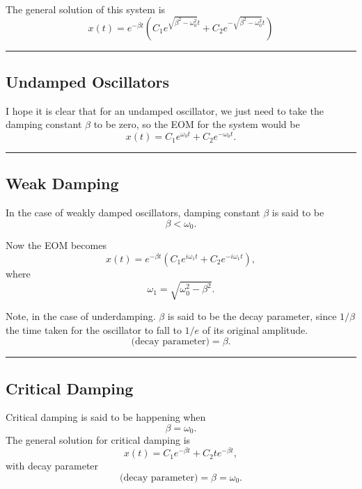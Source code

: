 \documentclass[12pt,english]{article}
\numberwithin{equation}{subsection}
\begin{document}
The general solution of this system is
\begin{equation}
    x(t) = e^{-\beta t}\left(C_1 e^{\sqrt{\beta^2-\omega_0^2}t} + C_2 e^{-\sqrt{\beta^2-\omega_0^2}t}\right)
\end{equation}

\par\noindent\rule{\textwidth}{0.4pt}
\subsection{Undamped Oscillators}
I hope it is clear that for an undamped oscillator, we just need to take the damping constant $\beta$ to be zero, so the EOM for the system would be
\begin{equation}
    x(t) = C_1 e^{\omega_0 t} + C_2 e^{-\omega_0 t}.
\end{equation}

\par\noindent\rule{\textwidth}{0.4pt}
\subsection{Weak Damping}
In the case of weakly damped oscillators, damping constant $\beta$ is said to be
\begin{equation*}
    \beta < \omega_0.
\end{equation*}

Now the EOM becomes
\begin{equation}
    x(t) = e^{-\beta t}\left(C_1 e^{i \omega_1 t} + C_2 e^{-i \omega_1 t}\right),
\end{equation}
where
\begin{equation*}
    \omega_1 = \sqrt{\omega_0^2 - \beta^2}.
\end{equation*}

Note, in the case of underdamping. $\beta$ is said to be the decay parameter, since $1/\beta$ the time taken for the oscillator to fall to $1/e$ of its original amplitude.
\begin{equation*}
    \text{(decay parameter)} = \beta.
\end{equation*}

\par\noindent\rule{\textwidth}{0.4pt}
\subsection{Critical Damping}
Critical damping is said to be happening when
\begin{equation*}
    \beta = \omega_0.
\end{equation*}
The general solution for critical damping is
\begin{equation}
    x(t) = C_1 e^{-\beta t} + C_2 t e^{-\beta t},
\end{equation}
with decay parameter
\begin{equation*}
    \text{(decay parameter)} = \beta = \omega_0.
\end{equation*}
\end{document}

